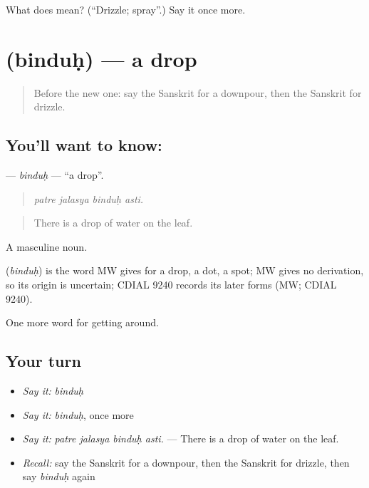 \begin{tcolorbox}[breakable,colback=teal!4,colframe=teal!35!black,title={Before you move on}]
What does  mean? (\textquotedblleft{}Drizzle; spray\textquotedblright{}.) Say it once more.
\end{tcolorbox}
\section[\texorpdfstring{\sk{बिन्दुः} (binduḥ)}{बिन्दुः (binduḥ)}]{ (binduḥ) — a drop}

\label{lesson:SA-C437-binduh}



\begin{quote}
Before the new one: say the Sanskrit for a downpour, then the Sanskrit for drizzle.
\end{quote}

\subsection*{You'll want to know: }
\textbf{} — \emph{binduḥ} — \textquotedblleft{}a drop\textquotedblright{}.

\begin{quote}
   
\end{quote}

\begin{quote}
\emph{patre jalasya binduḥ asti.}
\end{quote}

\begin{quote}
There is a drop of water on the leaf.
\end{quote}

A masculine noun.

\begin{cousinweb}
\textbf{} (\emph{binduḥ}) is the word MW gives for a drop, a dot, a spot; MW gives no derivation, so its origin is uncertain; CDIAL 9240 records its later forms (MW; CDIAL 9240).
\end{cousinweb}

\begin{grammarlens}[title={What you've built}]
One more word for getting around.
\end{grammarlens}

\subsection*{Your turn}
\begin{itemize}
\raggedright
  \item \emph{Say it:} \emph{binduḥ}
  \item \emph{Say it:} \emph{binduḥ}, once more
  \item \emph{Say it:} \emph{patre jalasya binduḥ asti.} — There is a drop of water on the leaf.
  \item \emph{Recall:} say the Sanskrit for a downpour, then the Sanskrit for drizzle, then say \emph{binduḥ} again
\end{itemize}

